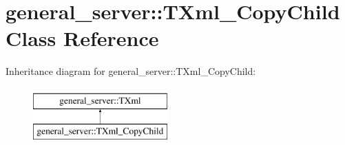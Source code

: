 \hypertarget{classgeneral__server_1_1TXml__CopyChild}{\section{general\-\_\-server\-:\-:\-T\-Xml\-\_\-\-Copy\-Child \-Class \-Reference}
\label{classgeneral__server_1_1TXml__CopyChild}
}
\-Inheritance diagram for general\-\_\-server\-:\-:\-T\-Xml\-\_\-\-Copy\-Child\-:\begin{figure}[H]
\begin{center}
\leavevmode
\includegraphics[height=2.000000cm]{classgeneral__server_1_1TXml__CopyChild}
\end{center}
\end{figure}
